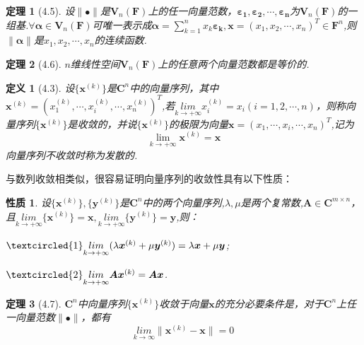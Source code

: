 \documentclass{sintefbeamer}[dark]
\newtheorem*{定义}{定义}
\newtheorem*{定理}{定理}
\newtheorem*{性质}{性质}
\begin{document}
\begin{frame}
	\begin{定理}[4.5]
		设$\|\bullet\|$是$\bm{V}_{n}(\bm{F})$上的任一向量范数，$\bm{\varepsilon _{1}},\bm{\varepsilon _{2}},\cdots,\bm{\varepsilon _{n}}$为$\bm{V}_{n}(\bm{F})$的一组基.$\forall\bm{\alpha} \in\bm{V}_{n}(\bm{F})$可唯一表示成$\bm{\alpha} =\sum\limits_{k=1}^{n} x_{k}\bm{\varepsilon _{k}},\bm{x}=(x_{1}, x_{2},\cdots,x_{n})^{T}\in\bm{F}^{n}$,则$\|\bm{\alpha}\|$是$x_{1},x_{2},\cdots,x_{n}$的连续函数.
		\end{定理}
	\pause
	\begin{定理}[4.6]
		$n$维线性空间$\bm{V}_{n}(\bm{F})$上的任意两个向量范数都是等价的.
		\end{定理}
\end{frame}
\begin{frame}
	\begin{定义}[4.3]
		设$\{\bm{x}^{(k)}\}$是$\mathbf{C}^{n}$中的向量序列，其中$\bm{x}^{(k)}=(x_{1}^{(k)},\cdots,x_{i}^{(k)},\cdots,x_{n}^{(k)})^{T}$,若$\underset{k \to +\infty}{lim} x_{i} ^{(k)}=x_{i}(i=1,2,\cdots,n)$，则称向量序列$\{\bm{x}^{(k)}\}$是收敛的，并说$\{\bm{x}^{(k)}\}$的极限为向量$\bm{x}=(x_{1},\cdots,x_{i},\cdots,x_{n})^{T}$,记为
		$$
		\lim_{k \to +\infty} \bm{x}^{(k)}=\bm{x}
		$$
		\linebreak
		向量序列不收敛时称为发散的.
		\end{定义}
\end{frame}
\begin{frame}
	\qquad
	与数列收敛相类似，很容易证明向量序列的收敛性具有以下性质：
	\begin{性质}
		设$\{\bm{x}^{(k)}\},\{\bm{y}^{(k)}\}$是$\mathbf{C}^{n}$中的两个向量序列,$\lambda ,\mu $是两个复常数,$\bm{A}\in\mathbf{C}^{m\times n}$，且$\underset{k\to+\infty}{lim}{\{\bm{x}^{(k)}\}}=\bm{x},\underset{k\to+\infty}{lim}{\{\bm{y}^{(k)}\}}=\bm{y}$,则：
		\par
		$\textcircled{1}\underset{k \to +\infty}{lim} (\lambda\bm{x}^{(k)}+\mu\bm{y}^{(k)})=\lambda\bm{x}+\mu\bm{y}$;
		\par
		$\textcircled{2}\underset{k \to +\infty}{lim}\bm{A}\bm{x}^{(k)}=\bm{A}\bm{x}$.
		
		\end{性质}
	\pause
	\begin{定理}[4.7]
		$\mathbf{C}^{n}$中向量序列$\{\bm{x}^{(k)}\}$收敛于向量$\bm{x}$的充分必要条件是，对于$\mathbf{C}^{n}$上任一向量范数$\|\bullet\|$，都有
		$$
		\underset{k\to \infty}{lim}\|\bm{x}^{(k)}-\bm{x}\|=0
		$$
		\end{定理}
	
\end{frame}
\end{document}
